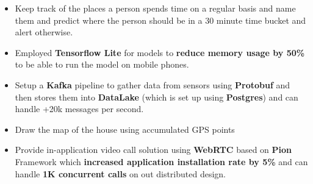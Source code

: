 \vspace{0.5cm}

\begin{itemize}
      \item Keep track of the places a person spends time on a regular basis and name them and predict where the person should be in a 30 minute time bucket and alert otherwise.
      \item Employed \textbf{Tensorflow Lite} for models to \textbf{reduce memory usage by 50\%} to be able to run the model on mobile phones.
      \item Setup a \textbf{Kafka} pipeline to gather data from sensors using \textbf{Protobuf} and
            then stores them into \textbf{DataLake} (which is set up using \textbf{Postgres}) and can handle +20k messages per second.
      \item Draw the map of the house using accumulated GPS points
      \item Provide in-application video call solution using \textbf{WebRTC} based on \textbf{Pion} Framework which \textbf{increased application installation rate by 5\%} and can handle \textbf{1K concurrent calls} on out distributed design.
\end{itemize}
